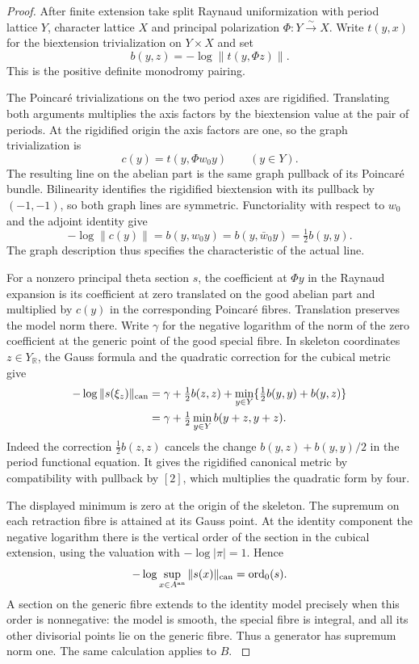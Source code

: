 \begin{proof}
After finite extension take split Raynaud uniformization with period
lattice \(Y\), character lattice \(X\) and principal polarization
\(\Phi:Y\overset{\sim}{\to}X\). Write \(t(y,x)\) for the
biextension trivialization on \(Y\times X\) and set
\[
     b(y,z)=-\log\|t(y,\Phi z)\| .
\]
This is the positive definite monodromy pairing.

The Poincar\'e trivializations on the two period axes are rigidified.
Translating both arguments multiplies the axis factors by the
biextension value at the pair of periods. At the rigidified origin
the axis factors are one, so the graph trivialization is
\[
                     c(y)=t(y,\Phi w_0y)\qquad(y\in Y).
\] The resulting line on the abelian part is the same graph
pullback of its Poincar\'e bundle. Bilinearity identifies the
rigidified biextension with its pullback by \((-1,-1)\), so both
graph lines are symmetric. Functoriality with respect to
\(w_0\) and the adjoint identity give
\[
          -\log\|c(y)\|=b(y,w_0y)=b(y,\bar w_0 y)
                      =\tfrac12 b(y,y).
\]
The graph description thus specifies the characteristic of the
actual line. \cite[preprint, Section~3.4 and Theorems~3.10, 4.10]{frss-nonarch-theta}

For a nonzero principal theta section \(s\), the coefficient at
\(\Phi y\) in the Raynaud expansion is its coefficient at zero
translated on the good abelian part and multiplied by \(c(y)\)
in the corresponding Poincar\'e fibres. Translation preserves the
model norm there. Write \(\gamma\) for the negative logarithm of
the norm of the zero coefficient at the generic point of the good
special fibre. In skeleton coordinates \(z\in Y_{\mathbb R}\),
the Gauss formula and the quadratic correction for the cubical
metric give
\[
 \begin{aligned}
   -\log\|s(\xi_z)\|_{\rm can}
    &=\gamma+\tfrac12 b(z,z)
       +\min_{y\in Y}\{\tfrac12 b(y,y)+b(y,z)\}\\
    &=\gamma+\tfrac12\min_{y\in Y}b(y+z,y+z).
 \end{aligned}
\]
Indeed the correction \(\tfrac12 b(z,z)\) cancels the change
\(b(y,z)+b(y,y)/2\) in the period functional equation. It gives the
rigidified canonical metric by compatibility with pullback by
\([2]\), which multiplies the quadratic form by four.
\cite[Proposition~9.1 and its proof]{dejong-shokrieh-theta}

The displayed minimum is zero at the origin of the skeleton.
The supremum on each retraction fibre is attained at its Gauss point.
At the identity component the negative logarithm there is the
vertical order of the section in the cubical extension, using the
valuation with \(-\log|\pi|=1\). Hence
\[
       -\log\sup_{x\in A^{\rm an}}\|s(x)\|_{\rm can}
                    =\operatorname{ord}_{0}(s).
\]
A section on the generic fibre extends to the identity model
precisely when this order is nonnegative: the model is smooth,
the special fibre is integral, and all its other divisorial points
lie on the generic fibre. Thus a generator has supremum norm one.
The same calculation applies to \(B\). \cite[Proposition~10.3 and
Corollary~10.4]{dejong-shokrieh-theta}


\end{proof}
